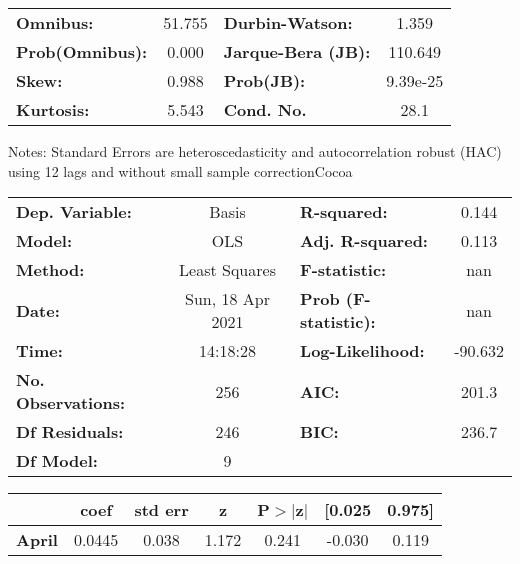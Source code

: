 \begin{center}
\begin{tabular}{lcccccc}
\bottomrule
\end{tabular}
\begin{tabular}{lclc}
\textbf{Omnibus:}       & 51.755 & \textbf{  Durbin-Watson:     } &    1.359  \\
\textbf{Prob(Omnibus):} &  0.000 & \textbf{  Jarque-Bera (JB):  } &  110.649  \\
\textbf{Skew:}          &  0.988 & \textbf{  Prob(JB):          } & 9.39e-25  \\
\textbf{Kurtosis:}      &  5.543 & \textbf{  Cond. No.          } &     28.1  \\
\bottomrule
\end{tabular}
\end{center}

Notes: \newline
 [1] Standard Errors are heteroscedasticity and autocorrelation robust (HAC) using 12 lags and without small sample correctionCocoa\begin{center}
\begin{tabular}{lclc}
\toprule
\textbf{Dep. Variable:}    &      Basis       & \textbf{  R-squared:         } &     0.144   \\
\textbf{Model:}            &       OLS        & \textbf{  Adj. R-squared:    } &     0.113   \\
\textbf{Method:}           &  Least Squares   & \textbf{  F-statistic:       } &       nan   \\
\textbf{Date:}             & Sun, 18 Apr 2021 & \textbf{  Prob (F-statistic):} &      nan    \\
\textbf{Time:}             &     14:18:28     & \textbf{  Log-Likelihood:    } &   -90.632   \\
\textbf{No. Observations:} &         256      & \textbf{  AIC:               } &     201.3   \\
\textbf{Df Residuals:}     &         246      & \textbf{  BIC:               } &     236.7   \\
\textbf{Df Model:}         &           9      & \textbf{                     } &             \\
\bottomrule
\end{tabular}
\begin{tabular}{lcccccc}
                   & \textbf{coef} & \textbf{std err} & \textbf{z} & \textbf{P$> |$z$|$} & \textbf{[0.025} & \textbf{0.975]}  \\
\midrule
\textbf{April}     &       0.0445  &        0.038     &     1.172  &         0.241        &       -0.030    &        0.119     \\

\end{tabular}
\end{center}
